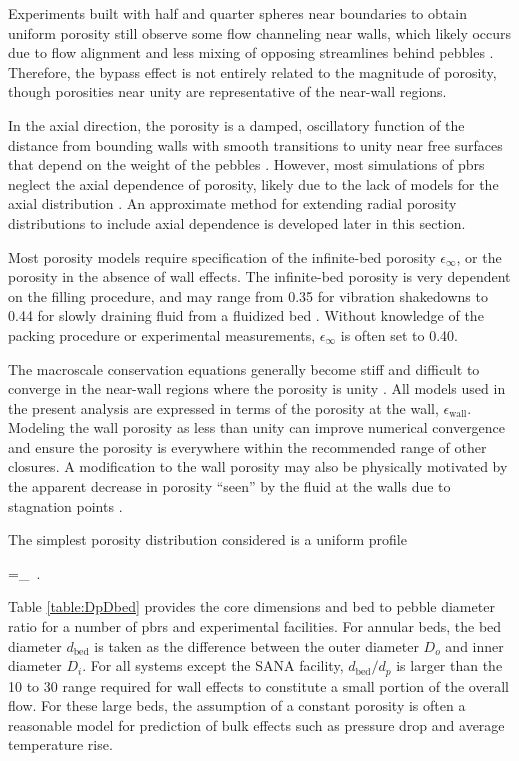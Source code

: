 Experiments built with half and quarter spheres near boundaries to obtain uniform porosity still observe some flow channeling near walls, which likely occurs due to flow alignment and less mixing of opposing streamlines behind pebbles \cite{mickley}. Therefore, the bypass effect is not entirely related to the magnitude of porosity, though porosities near unity are representative of the near-wall regions.

In the axial direction, the porosity is a damped, oscillatory function of the distance from bounding walls with smooth transitions to unity near free surfaces that depend on the weight of the pebbles \cite{auwerda2013,duToit2008,y_li,sun,abdalla}. However, most simulations of \glspl{pbr} neglect the axial dependence of porosity, likely due to the lack of models for the axial distribution \cite{becker, becker2003, duToit2006, lim, nouri, tecdoc1163, baggemann, ge}. An approximate method for extending radial porosity distributions to include axial dependence is developed later in this section.

Most porosity models require specification of the infinite-bed porosity \(\epsilon_\infty\), or the porosity in the absence of wall effects. The infinite-bed porosity is very dependent on the filling procedure, and may range from 0.35 for vibration shakedowns to 0.44 for slowly draining fluid from a fluidized bed \cite{klerk}. Without knowledge of the packing procedure or experimental measurements, \(\epsilon_\infty\) is often set to 0.40. 

The macroscale conservation equations generally become stiff and difficult to converge in the near-wall regions where the porosity is unity \cite{vortmeyer}. All models used in the present analysis are expressed in terms of the porosity at the wall, \(\epsilon_\text{wall}\). Modeling the wall porosity as less than unity can improve numerical convergence and ensure the porosity is everywhere within the recommended range of other closures. A modification to the wall porosity may also be physically motivated by the apparent decrease in porosity ``seen'' by the fluid at the walls due to stagnation points \cite{abdulmohsin,giese,becker2003}.

The simplest porosity distribution considered is a uniform profile

\beq
\label{eq:ConstantEps}
\epsilon=\epsilon_\infty\ .
\eeq

\noindent Table \ref{table:DpDbed} provides the core dimensions and bed to pebble diameter ratio for a number of \glspl{pbr} and experimental facilities. For annular beds, the bed diameter \(d_\text{bed}\) is taken as the difference between the outer diameter \(D_o\) and inner diameter \(D_i\). For all systems except the SANA facility, \(d_\text{bed}/d_p\) is larger than the 10 to 30 range required for wall effects to constitute a small portion of the overall flow. For these large beds, the assumption of a constant porosity is often a reasonable model for prediction of bulk effects such as pressure drop and average temperature rise.

